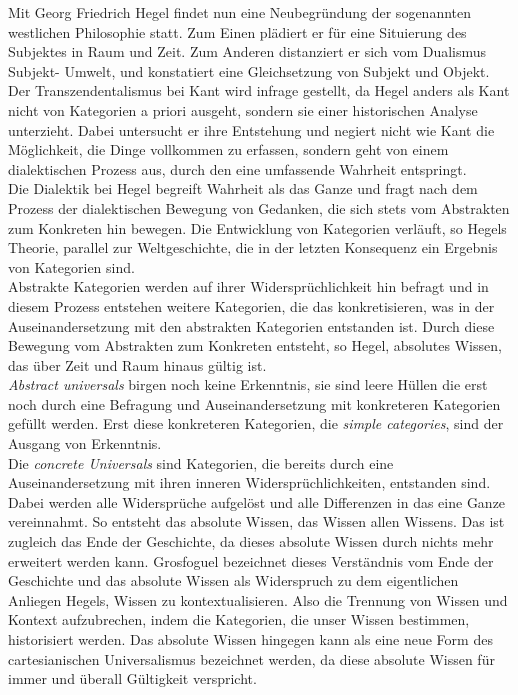 Mit Georg Friedrich Hegel findet nun eine Neubegründung der sogenannten
westlichen Philosophie statt. Zum Einen plädiert er für eine Situierung des
Subjektes in Raum und Zeit.\footnotemark {}
 Zum Anderen distanziert er sich vom Dualismus
Subjekt- Umwelt, und konstatiert eine Gleichsetzung von Subjekt und Objekt. Der
Transzendentalismus bei Kant wird infrage gestellt, da Hegel anders als Kant
nicht von Kategorien a priori ausgeht, sondern sie einer historischen Analyse
unterzieht. Dabei untersucht er ihre Entstehung und negiert nicht wie Kant die
Möglichkeit, die Dinge vollkommen zu erfassen, sondern geht von einem
dialektischen Prozess aus, durch den eine umfassende Wahrheit entspringt.\footnotemark {}\\ 
Die Dialektik bei Hegel begreift Wahrheit als das Ganze und fragt nach dem
Prozess der dialektischen Bewegung von Gedanken, die sich stets vom Abstrakten
zum Konkreten hin bewegen. Die Entwicklung von Kategorien verläuft, so Hegels
Theorie, parallel zur Weltgeschichte, die in der letzten Konsequenz ein
Ergebnis von Kategorien sind.\footnotemark {}\\
Abstrakte Kategorien werden auf ihrer Widersprüchlichkeit hin befragt und in
diesem Prozess entstehen weitere Kategorien, die das konkretisieren, was in der
Auseinandersetzung mit den abstrakten Kategorien entstanden ist. Durch diese
Bewegung vom Abstrakten zum Konkreten entsteht, so Hegel, absolutes Wissen, das
über Zeit und Raum hinaus gültig ist.\\
\textit{Abstract universals} birgen noch keine
Erkenntnis, sie sind leere Hüllen die erst noch durch eine Befragung und
Auseinandersetzung mit konkreteren Kategorien gefüllt werden. Erst diese
konkreteren Kategorien, die \textit{simple categories}, sind der Ausgang von
Erkenntnis.\footnotemark {}\\
Die \textit{concrete Universals} sind Kategorien, die bereits durch eine
Auseinandersetzung mit ihren inneren Widersprüchlichkeiten, entstanden
sind.\footnotemark {} Dabei werden alle Widersprüche aufgelöst und alle Differenzen in das eine
Ganze vereinnahmt. So entsteht das absolute Wissen, das Wissen allen
Wissens.\footnotemark {} Das ist zugleich das Ende der Geschichte, da dieses absolute Wissen
durch nichts mehr erweitert werden kann. Grosfoguel bezeichnet dieses
Verständnis vom Ende der Geschichte und das absolute Wissen als Widerspruch zu
dem eigentlichen Anliegen Hegels, Wissen zu kontextualisieren. Also die
Trennung von Wissen und Kontext aufzubrechen, indem die Kategorien, die unser
Wissen bestimmen, historisiert werden. Das absolute Wissen hingegen kann als
eine neue Form des cartesianischen Universalismus bezeichnet werden, da diese
absolute Wissen für immer und überall Gültigkeit verspricht.\\


